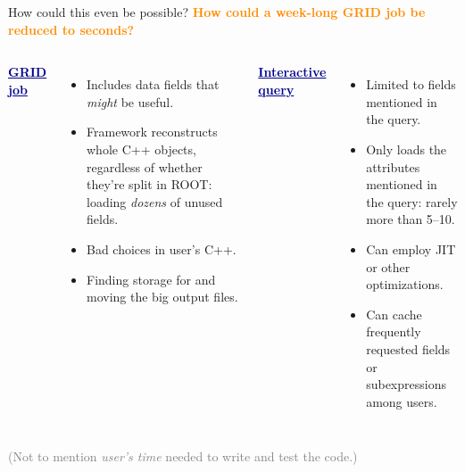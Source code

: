 \documentclass{beamer}
\begin{document}
\begin{frame}{How could this even be possible?}
\vspace{0.5 cm}
\textcolor{darkorange}{\bf How could a week-long GRID job be reduced to seconds?}

\vspace{0.5 cm}
\begin{columns}[t]
\textcolor{darkblue}{\underline{\bf GRID job}}

\begin{itemize}
\item Includes data fields that {\it might} be useful.

\item Framework reconstructs whole C++ objects, regardless of whether they're split in ROOT: loading {\it dozens} of unused fields.

\item Bad choices in user's C++.

\item Finding storage for and moving the big output files.
\end{itemize}

\textcolor{darkblue}{\underline{\bf Interactive query}}

\begin{itemize}
\item Limited to fields mentioned in the query.

\item Only loads the attributes mentioned in the query: rarely more than 5--10.

\item Can employ JIT or other optimizations.

\item Can cache frequently requested fields or subexpressions among users.
\end{itemize}
\end{columns}

\vspace{0.5 cm}
\textcolor{gray}{(Not to mention {\it user's time} needed to write and test the code.)}
\end{frame}
\end{document}
